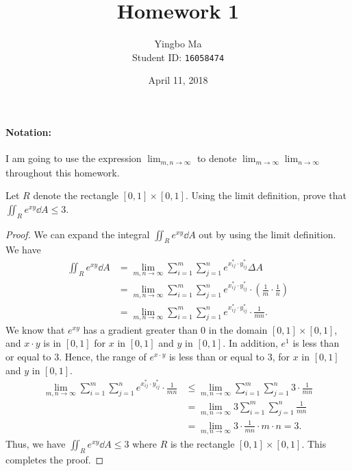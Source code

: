 \documentclass[10pt,twocolumn]{article}
\author{Yingbo Ma \\ Student ID: \tt{16058474}}
\date{April 11, 2018}
\title{Homework 1}
\begin{document}
\maketitle

\paragraph{Notation:}
I am going to use the expression $\lim_{m,n\to\infty}$ to denote
$\lim_{m\to\infty}\lim_{n\to\infty}$ throughout this homework.

\begin{exercise}{1}
  Let $R$ denote the rectangle $[0, 1]\times [0, 1]$. Using the limit definition,
  prove that $\iint_{R}e^{xy}\dd{A} \le 3$.
\end{exercise}

\begin{proof}
  We can expand the integral $\iint_{R}e^{xy}\dd{A}$ out by using the limit
  definition. We have
  \begin{align*}
    \iint_{R}e^{xy}\dd{A} &= \lim_{m,n\to \infty} \sum_{i=1}^m \sum_{j=1}^n
                            e^{x_{ij}^* \cdot y_{ij}^*} \Delta A \\
    &= \lim_{m,n\to \infty} \sum_{i=1}^m \sum_{j=1}^n
                            e^{x_{ij}^* \cdot y_{ij}^*} \cdot
                            (\frac{1}{m}\cdot \frac{1}{n}) \\
    &= \lim_{m,n\to \infty} \sum_{i=1}^m \sum_{j=1}^n
                            e^{x_{ij}^* \cdot y_{ij}^*} \cdot
                            \frac{1}{mn}.
  \end{align*}
  We know that $e^{xy}$ has a gradient greater than $0$ in the domain
  $[0,1]\times[0,1]$, and $x\cdot y$ is in $[0,1]$ for $x$ in $[0,1]$ and $y$
  in $[0,1]$. In addition, $e^1$ is less than or equal to $3$. Hence, the range
  of $e^{x\cdot y}$ is less than or equal to $3$, for $x$ in $[0,1]$ and $y$ in
  $[0,1]$.
  \begin{align*}
    \lim_{m,n\to \infty} \sum_{i=1}^m \sum_{j=1}^n
                            e^{x_{ij}^* \cdot y_{ij}^*} \cdot
                            \frac{1}{mn}
    &\le \lim_{m,n\to \infty} \sum_{i=1}^m \sum_{j=1}^n
                            3 \cdot
                            \frac{1}{mn} \\
    &= \lim_{m,n\to \infty} 3\sum_{i=1}^m \sum_{j=1}^n
                              \frac{1}{mn} \\
    &= \lim_{m,n\to \infty} 3\cdot \frac{1}{mn}\cdot m\cdot n = 3.
  \end{align*}
  Thus, we have $\iint_{R}e^{xy}\dd{A} \le 3$ where $R$ is the rectangle
  $[0,1]\times [0,1]$. This completes the proof.
\end{proof}
\end{document}
